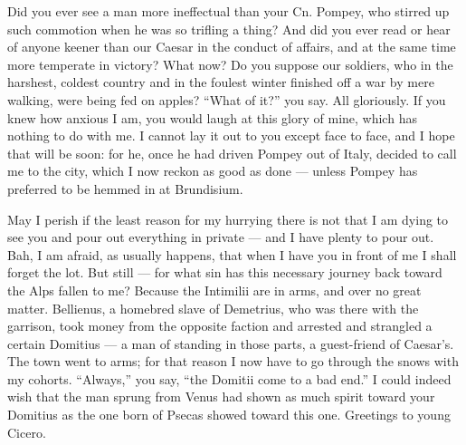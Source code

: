 

 Did you ever see a man more ineffectual than your Cn. Pompey, who stirred up such commotion when he was so trifling a thing? And did you ever read or hear of anyone keener than our Caesar in the conduct of affairs, and at the same time more temperate in victory? What now? Do you suppose our soldiers, who in the harshest, coldest country and in the foulest winter finished off a war by mere walking, were being fed on apples? ``What of it?'' you say. All gloriously. If you knew how anxious I am, you would laugh at this glory of mine, which has nothing to do with me. I cannot lay it out to you except face to face, and I hope that will be soon: for he, once he had driven Pompey out of Italy, decided to call me to the city, which I now reckon as good as done --- unless Pompey has preferred to be hemmed in at Brundisium.

 May I perish if the least reason for my hurrying there is not that I am dying to see you and pour out everything in private --- and I have plenty to pour out. Bah, I am afraid, as usually happens, that when I have you in front of me I shall forget the lot. But still --- for what sin has this necessary journey back toward the Alps fallen to me? Because the Intimilii are in arms, and over no great matter. Bellienus, a homebred slave of Demetrius, who was there with the garrison, took money from the opposite faction and arrested and strangled a certain Domitius --- a man of standing in those parts, a guest-friend of Caesar's. The town went to arms; for that reason I now have to go through the snows with my cohorts. ``Always,'' you say, ``the Domitii come to a bad end.'' I could indeed wish that the man sprung from Venus had shown as much spirit toward your Domitius as the one born of Psecas showed toward this one. Greetings to young Cicero.

